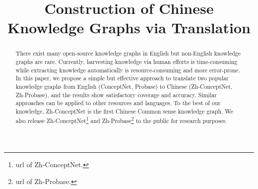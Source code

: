 \documentclass[sigconf]{acmart}
\title{Construction of Chinese Knowledge Graphs via Translation}
\newcommand{\zhcon}{Zh-ConceptNet\xspace}
\newcommand{\zhpro}{Zh-Probase\xspace}
\newcommand{\con}{ConceptNet\xspace}
\newcommand{\pro}{Probase\xspace}
\newcommand{\TD}[1]{\textcolor{red}{#1}}
\begin{document}
\author{}
\email{}
\affiliation{%
	\institution{}
	\streetaddress{}
	\city{}
	\state{}
	\postcode{}
}

\begin{abstract}
There exist many open-source knowledge graphs in English but non-English knowledge graphs 
are rare. Currently, harvesting knowledge via human efforts is time-consuming while extracting knowledge automatically is resource-consuming and more error-prone. 
In this paper, we propose a simple but effective approach to translate
two popular knowledge graphs from English (\con, \pro) to Chinese (\zhcon, \zhpro), 
and the results show satisfactory coverage and accuracy. 
Similar approaches can be applied to other resources and languages. 
To the best of our knowledge, \zhcon is the first Chinese Common sense knowledge graph. 
We also release \zhcon\footnote{url of \zhcon.} and \zhpro\footnote{url of \zhpro.} 
to the public for research purposes. 
\end{abstract}


\maketitle
\begin{CJK}{UTF8}{gkai}
	
	
	
	
	
	
\end{CJK}
\end{document}
